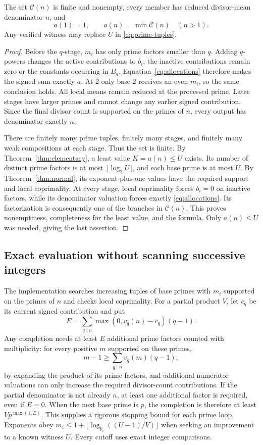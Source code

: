 \begin{theorem}\label{thm:all-minimum}
The set $\mathcal C(n)$ is finite and nonempty, every member has reduced
divisor-mean denominator $n$, and
\begin{equation}\label{eq:all-minimum}
 \boxed{a(1)=1,\qquad a(n)=\min\mathcal C(n)\quad(n>1).}
\end{equation}
Any verified witness may replace $U$ in \eqref{eq:prime-tuples}.
\end{theorem}
\begin{proof}
Before the $q$-stage, $m_i$ has only prime factors smaller than $q$.
Adding $q$-powers changes the active contributions to $b_i$; the
inactive contributions remain zero or the constants occurring in $B_q$.
Equation~\eqref{eq:allocations} therefore makes the signed sum exactly
$a$. At 2 only base 2 receives an even $m_i$, so the same conclusion
holds. All local means remain reduced at the processed prime.
Later stages have larger primes and cannot change any earlier signed
contribution. Since the final divisor count is supported on the primes
of $n$, every output has denominator exactly $n$.

There are finitely many prime tuples, finitely many stages, and finitely
many weak compositions at each stage. Thus the set is finite.
By Theorem~\ref{thm:elementary}, a least value $K=a(n)\le U$ exists.
Its number of distinct prime factors is at most $\lfloor\log_2 U\rfloor$,
and each base prime is at most $U$. By Theorem~\ref{thm:normal}, its
exponent-plus-one values have the required support and local coprimality.
At every stage, local coprimality forces $b_i=0$ on inactive factors,
while its denominator valuation forces exactly \eqref{eq:allocations}.
Its factorization is consequently one of the branches in $\mathcal C(n)$.
This proves nonemptiness, completeness for the least value, and the
formula. Only $a(n)\le U$ was needed, giving the last assertion.
\end{proof}

\subsection{Exact evaluation without scanning successive integers}
The implementation searches increasing tuples of base primes with
$m_i$ supported on the primes of $n$ and checks local coprimality.
For a partial product $V$, let $c_q$ be its current signed contribution
and put
\[
 E=\sum_{q\mid n}\max(0,v_q(n)-c_q)(q-1).
\]
Any completion needs at least $E$ additional prime factors counted
with multiplicity: for every positive $m$ supported on these primes,
\[
 m-1\ge\sum_{q\mid n}v_q(m)(q-1),
\]
by expanding the product of its prime factors, and additional numerator
valuations can only increase the required divisor-count contributions.
If the partial denominator is not already $n$, at least one additional
factor is required, even if $E=0$. When the next base prime is $p$, the
completion is therefore at least $Vp^{\max(1,E)}$. This supplies a
rigorous stopping bound for each prime loop. Exponents obey
$m_i\le1+\lfloor\log_{p_i}((U-1)/V)\rfloor$ when seeking an improvement
to a known witness $U$. Every cutoff uses exact integer comparisons.

